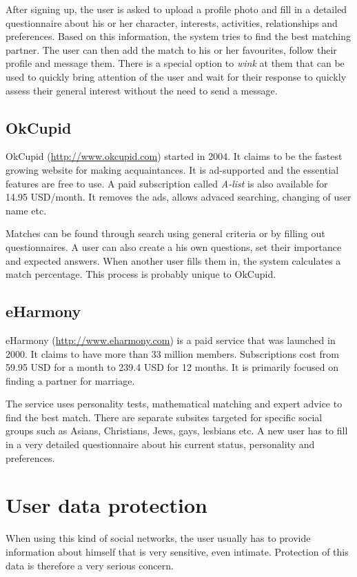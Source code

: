 \documentclass[12pt,oneside]{fithesis}
\begin{document}
		After signing up, the user is asked to upload a profile photo and fill in a detailed questionnaire about his or her character, interests, activities, relationships and preferences. Based on this information, the system tries to find the best matching partner. The user can then add the match to his or her favourites, follow their profile and message them. There is a special option to \emph{wink} at them that can be used to quickly bring attention of the user and wait for their response to quickly assess their general interest without the need to send a message. \cite{website:match}
		
		\subsection{OkCupid}
		OkCupid (\url{http://www.okcupid.com}) started in 2004. It claims to be the fastest growing website for making acquaintances.
		It is ad-supported and the essential features are free to use. A paid subscription called \emph{A-list} is also available for 14.95 USD/month. It removes the ads, allows advaced searching, changing of user name etc.
		
		Matches can be found through search using general criteria or by filling out questionnaires. A user can also create a his own questions, set their importance and expected answers. When another user fills them in, the system calculates a match percentage. This process is probably unique to OkCupid. \cite{website:okcupid}
		\subsection{eHarmony}
		eHarmony (\url{http://www.eharmony.com}) is a paid service that was launched in 2000. It claims to have more than 33 million members. Subscriptions cost from 59.95 USD for a month  to 239.4 USD for 12 months. It is primarily focused on finding a partner for marriage.
		
		The service uses personality tests, mathematical matching and expert advice to find the best match. There are separate subsites targeted for specific social groups such as Asians, Christians, Jews, gays, lesbians etc. A new user has to fill in a very detailed questionnaire about his current status, personality and preferences.\cite{website:eharmony}
\section{User data protection}
	When using this kind of social networks, the user usually has to provide information about himself that is very sensitive, even intimate. Protection of this data is therefore a very serious concern.
	
\end{document}
